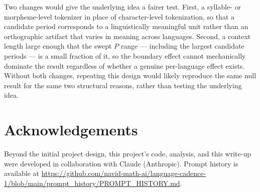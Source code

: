 \documentclass[11pt]{article}
\begin{document}
Two changes would give the underlying idea a fairer test. First, a syllable- or morpheme-level tokenizer in place of character-level tokenization, so that a candidate period corresponds to a linguistically meaningful unit rather than an orthographic artifact that varies in meaning across languages. Second, a context length large enough that the swept $P$ range --- including the largest candidate periods --- is a small fraction of it, so the boundary effect cannot mechanically dominate the result regardless of whether a genuine per-language effect exists. Without both changes, repeating this design would likely reproduce the same null result for the same two structural reasons, rather than testing the underlying idea.

\section*{Acknowledgements}

Beyond the initial project design, this project's code, analysis, and this write-up were developed in collaboration with Claude (Anthropic). Prompt history is available at \url{https://github.com/navid-math-ai/language-cadence-1/blob/main/prompt_history/PROMPT_HISTORY.md}.



\end{document}
